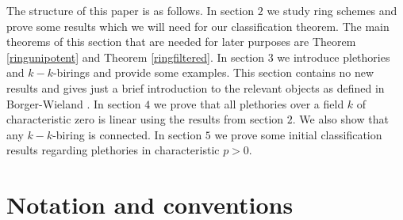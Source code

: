\documentclass[a4paper, 12pt]{amsart}
\numberwithin{equation}{section}
\theoremstyle{definition}
\begin{document}
\noindent The structure of this paper is as follows. In section $2$ we study ring schemes and prove some results which we will need for our classification theorem. The main theorems of this section that are needed for later purposes are Theorem \ref{ringunipotent} and Theorem \ref{ringfiltered}. In section $3$ we introduce plethories and $k-k$-birings and provide some examples. This section contains no new results and gives just a brief introduction to the relevant objects as defined in Borger-Wieland \cite{BW}. In section $4$ we prove that all plethories over a field $k$ of characteristic zero is linear using the results from section $2.$ We also show that any $k-k$-biring is connected. In section $5$ we prove some initial classification results regarding plethories in characteristic $p>0.$	 
\section*{Notation and conventions}
\end{document}
